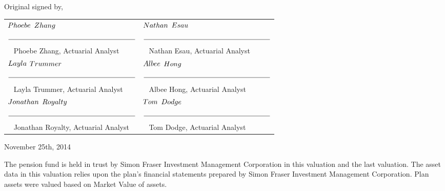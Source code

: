 \documentclass{report}
\begin{document}
\vspace{8mm}
Original signed by,
\vspace{8mm}

\begin{table}[ht]
\large
\begin{tabular}{p{8cm} p{8cm}}
\hspace{5mm} $\mathnormal{Phoebe}$ $\mathnormal{Zhang}$ & \hspace{5mm} $\mathnormal{Nathan}$ $\mathnormal{Esau}$ \\
$\overline{\mbox{ \hspace{60mm} }}$ & $\overline{\mbox{ \hspace{60mm} }}$ \\ \mbox{ } Phoebe Zhang, Actuarial Analyst & \mbox{ } Nathan Esau, Actuarial Analyst \vspace{9mm} \\ 
\hspace{5mm} $\mathnormal{Layla}$ $\mathnormal{Trummer}$ & \hspace{5mm} $\mathnormal{Albee}$ $\mathnormal{Hong}$ \\
$\overline{\mbox{ \hspace{60mm} }}$ & $\overline{\mbox{ \hspace{60mm} }}$ \\ \mbox{ } Layla Trummer, Actuarial Analyst & \mbox{ } Albee Hong, Actuarial Analyst \vspace{9mm} \\ 
\hspace{5mm} $\mathnormal{Jonathan}$ $\mathnormal{Royalty}$ & \hspace{5mm} $\mathnormal{Tom}$ $\mathnormal{Dodge}$ \\ 
$\overline{\mbox{ \hspace{60mm} }}$ & $\overline{\mbox{ \hspace{60mm} }}$ \\ \mbox{ } Jonathan Royalty, Actuarial Analyst & \mbox{ } Tom Dodge, Actuarial Analyst \vspace{9mm} \\ 
\end{tabular}
\end{table}

\vspace{3mm}
November 25th, 2014


The pension fund is held in trust by Simon Fraser Investment Management Corporation in this valuation and the last valuation. The asset data in this valuation relies upon the plan's financial statements prepared by Simon Fraser Investment Management Corporation. Plan assets were valued based on Market Value of assets.
\end{document}
